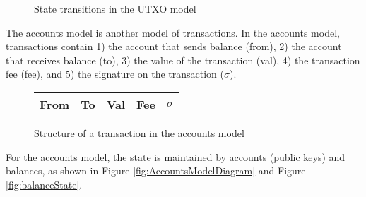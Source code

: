 \begin{figure}[h]
    \centering
    \caption{State transitions in the UTXO model}
    \label{fig:UTXOModelDiagram}
\end{figure}

The accounts model is another model of transactions.
In the accounts model, transactions contain 1) the account that sends balance (from), 2) the account that receives balance (to), 3) the value of the transaction (val), 4) the transaction fee (fee), and 5) the signature on the transaction ($\sigma$).

\begin{figure}[h]
\centering
    \begin{tabular}{|c|c|c|c|c|}
         \hline
         From & To & Val & Fee & {$\sigma$} \\
         \hline
    \end{tabular}
    \label{fig:accountsTx}
    \caption{Structure of a transaction in the accounts model}
\end{figure}

For the accounts model, the state is maintained by accounts (public keys) and balances, as shown in Figure \ref{fig:AccountsModelDiagram} and Figure \ref{fig:balanceState}.

